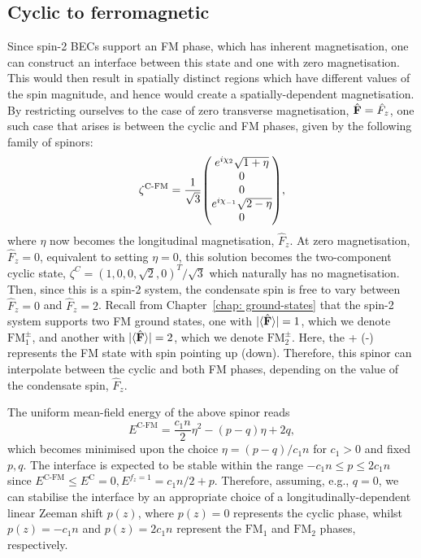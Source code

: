 \subsection{Cyclic to ferromagnetic}
Since spin-2 BECs support an FM phase, which has inherent
magnetisation, one can construct an interface between this state and
one with zero magnetisation.
This would then result in spatially distinct regions which have different values
of the spin magnitude, and hence would create a spatially-dependent
magnetisation.
By restricting ourselves to the case of zero transverse magnetisation,
\(\hat{\vb{F}} = \hat{F}_z\), one such case that arises is between the cyclic
and FM phases, given by the following family of spinors:
\begin{align}\label{eq: C-FM-interpolating-spinor}
    \zeta^\text{C-FM} = \frac{1}{\sqrt{3}}\mqty(
        e^{i\chi_2}\sqrt{1 + \eta} \\
        0 \\
        0 \\
        e^{i\chi_{-1}}\sqrt{2 - \eta} \\
        0
    ),
\end{align}
where \(\eta \) now becomes the longitudinal magnetisation, \(\hat{F}_z\).
At zero magnetisation, \(\hat{F}_z = 0\), equivalent to setting \(\eta=0\), this
solution becomes the two-component cyclic state,
\(\zeta^C = {(1, 0, 0, \sqrt{2}, 0)}^T/\sqrt{3}\) which naturally has no
magnetisation.
Then, since this is a spin-2 system, the condensate spin is free to vary between
\(\hat{F}_z = 0\) and \(\hat{F}_z = 2\).
Recall from Chapter~\ref{chap: ground-states} that the spin-2 system supports
two FM ground states, one with \(|\langle \hat{\vb{F}} \rangle | = 1\), which we denote
\(\text{FM}_1^\pm\), and another with \(|\langle \hat{\vb{F}} \rangle | = 2\), which we denote
\(\text{FM}_2^\pm\).
Here, the + (-) represents the FM state with spin pointing up (down).
Therefore, this spinor can interpolate between the cyclic and both FM phases,
depending on the value of the condensate spin, \(\hat{F}_z\).

The uniform mean-field energy of the above spinor reads
\begin{equation}
    E^\text{C-FM} = \frac{c_1 n}{2} \eta^2 - (p-q)\eta + 2q,
\end{equation}
which becomes minimised upon the choice \(\eta = (p-q)/c_1n\) for \(c_1 > 0\)
and fixed \(p, q\).
The interface is expected to be stable within the range
\(-c_1n \leq p \leq 2c_1n\) since \(E^\text{C-FM} \leq
E^\text{C}=0, E^{f_z=1} = c_1n/2 + p\).
Therefore, assuming, e.g., \(q=0\), we can stabilise the interface by an
appropriate choice of a longitudinally-dependent linear Zeeman shift \(p(z)\),
where \(p(z) = 0\) represents the cyclic phase, whilst \(p(z) = -c_1n\) and
\(p(z) = 2c_1n\) represent the \(\text{FM}_1\) and \(\text{FM}_2\) phases,
respectively.

